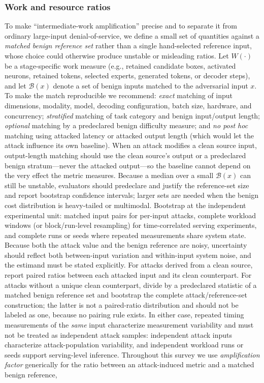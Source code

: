 \documentclass[acmsmall,screen,review,nonacm]{acmart}
\begin{document}
\subsubsection{Work and resource ratios}
To make ``intermediate-work amplification'' precise and to separate it from ordinary large-input denial-of-service, we define a small set of quantities against a \emph{matched benign reference set} rather than a single hand-selected reference input, whose choice could otherwise produce unstable or misleading ratios. Let $W(\cdot)$ be a stage-specific work measure (e.g., retained candidate boxes, activated neurons, retained tokens, selected experts, generated tokens, or decoder steps), and let $\mathcal{B}(x)$ denote a set of benign inputs matched to the adversarial input $x$. To make the match reproducible we recommend: \emph{exact} matching of input dimensions, modality, model, decoding configuration, batch size, hardware, and concurrency; \emph{stratified} matching of task category and benign input/output length; \emph{optional} matching by a predeclared benign difficulty measure; and \emph{no post hoc} matching using attacked latency or attacked output length (which would let the attack influence its own baseline). When an attack modifies a clean source input, output-length matching should use the clean source's output or a predeclared benign stratum---never the attacked output---so the baseline cannot depend on the very effect the metric measures. Because a median over a small $\mathcal{B}(x)$ can still be unstable, evaluators should predeclare and justify the reference-set size and report bootstrap confidence intervals; larger sets are needed when the benign cost distribution is heavy-tailed or multimodal. Bootstrap at the independent experimental unit: matched input pairs for per-input attacks, complete workload windows (or block/run-level resampling) for time-correlated serving experiments, and complete runs or seeds where repeated measurements share system state. Because both the attack value and the benign reference are noisy, uncertainty should reflect both between-input variation and within-input system noise, and the estimand must be stated explicitly. For attacks derived from a clean source, report paired ratios between each attacked input and its clean counterpart. For attacks without a unique clean counterpart, divide by a predeclared statistic of a matched benign reference set and bootstrap the complete attack/reference-set construction; the latter is not a paired-ratio distribution and should not be labeled as one, because no pairing rule exists. In either case, repeated timing measurements of the \emph{same} input characterize measurement variability and must not be treated as independent attack samples: independent attack inputs characterize attack-population variability, and independent workload runs or seeds support serving-level inference. Throughout this survey we use \emph{amplification factor} generically for the ratio between an attack-induced metric and a matched benign reference,
\end{document}
